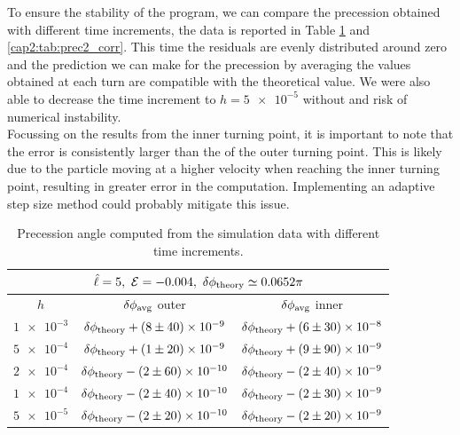 To ensure the stability of the program, we can compare the precession obtained
with different time increments, the data is reported in Table
\ref{cap2:tab:prec1_corr} and \ref{cap2:tab:prec2_corr}.
This time the residuals are evenly distributed around zero and the prediction we
can make for the precession by averaging the values obtained at each turn are
compatible with the theoretical value.
We were also able to decrease the time increment to $h = \num{5e-5}$ without
and risk of numerical instability. \\
Focussing on the results from the inner turning point, it is important to note
that the error is consistently larger than the of the outer turning
point.
This is likely due to the particle moving at a higher velocity when reaching the
inner turning point, resulting in greater error in the computation.
Implementing an adaptive step size method could probably mitigate this issue.

\begin{table}[h]
    \centering
    \begin{tabular}{|c|c|c|}
        \hline
        \multicolumn{3}{|c|}{$\hat \ell = 5, ~ \mathcal E = -0.004,
        ~ \delta \phi_{\rm theory} \simeq 0.0652 \pi$} \\
        \hline
        $h$ & $\delta \phi_{\rm avg}$ outer & $\delta \phi_{\rm avg}$ inner \\
        \hline
        $\num{1e-3}$ & $\delta \phi_{\rm theory} + (8 \pm 40) \times \num{e-9}$
        & $\delta \phi_{\rm theory} + (6 \pm 30) \times \num{e-8}$ \\
        \hline
        $\num{5e-4}$ & $\delta \phi_{\rm theory} + (1 \pm 20) \times \num{e-9}$
        & $\delta \phi_{\rm theory} + (9 \pm 90) \times \num{e-9}$ \\
        \hline
        $\num{2e-4}$ & $\delta \phi_{\rm theory} - (2 \pm 60) \times \num{e-10}$
        & $\delta \phi_{\rm theory} - (2 \pm 40) \times \num{e-9}$ \\
        \hline
        $\num{1e-4}$ & $\delta \phi_{\rm theory} - (2 \pm 40) \times \num{e-10}$
        & $\delta \phi_{\rm theory} - (2 \pm 30) \times \num{e-9}$ \\
        \hline
        $\num{5e-5}$ & $\delta \phi_{\rm theory} - (2 \pm 20) \times \num{e-10}$
        & $\delta \phi_{\rm theory} - (2 \pm 20) \times \num{e-9}$ \\
        \hline
    \end{tabular}
    \caption{Precession angle computed from the simulation data with different
    time increments.}
    \label{cap2:tab:prec1_corr}
\end{table}

